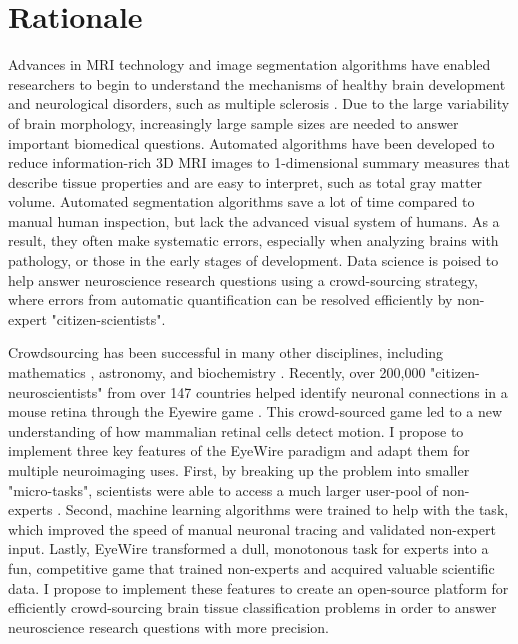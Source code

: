 \section*{Rationale}

Advances in MRI technology and image segmentation algorithms have enabled researchers to begin to understand the mechanisms of healthy brain development \cite{giedd1999brain} and neurological disorders, such as multiple sclerosis \cite{bakshi2008mri}. Due to the large variability of brain morphology, increasingly large sample sizes are needed to answer important biomedical questions. Automated algorithms have been developed to reduce information-rich 3D MRI images to 1-dimensional summary measures that describe tissue properties and are easy to interpret, such as total gray matter volume. Automated  segmentation algorithms save a lot of time compared to manual human inspection, but lack the advanced visual system of humans. As a result, they often make systematic errors, especially when analyzing brains with pathology, or those in the early stages of development. Data science is poised to help answer neuroscience research questions using a crowd-sourcing strategy, where errors from automatic quantification can be resolved efficiently by non-expert "citizen-scientists".

Crowdsourcing has been successful in many other disciplines\cite{wiggins2011conservation}, including mathematics \cite{cranshaw2011polymath}, astronomy\cite{lintott2008galaxy}, and biochemistry\cite{eiben2012increased} . Recently, over 200,000 "citizen-neuroscientists"  from over 147 countries helped identify neuronal connections in a mouse retina through the Eyewire game \cite{kim2014space}. This crowd-sourced game led to a new understanding of how mammalian retinal cells detect motion. I propose to implement three key features of the EyeWire paradigm and adapt them for multiple neuroimaging uses. First, by breaking up the problem into smaller "micro-tasks", scientists were able to access a much larger user-pool of non-experts \cite{kittur2008crowdsourcing}. Second, machine learning algorithms were trained to help with the task, which improved the speed of manual neuronal tracing and validated non-expert input. Lastly, EyeWire transformed a dull, monotonous task for experts into a fun, competitive game that trained non-experts and acquired valuable scientific data. I propose to implement these features to create an open-source platform for efficiently crowd-sourcing brain tissue classification problems in order to answer neuroscience research questions with more precision.

